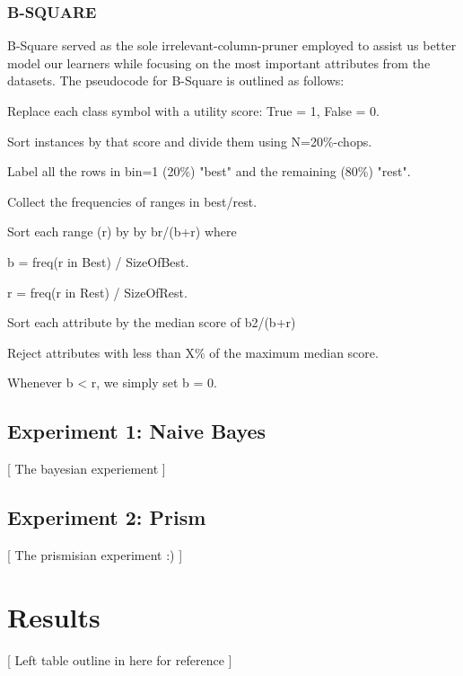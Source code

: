 \documentclass{sig-alternate}
\begin{document}
\subsubsection{B-SQUARE}
B-Square served as the sole irrelevant-column-pruner employed to assist us better model our learners while focusing on the most important attributes from the datasets. The pseudocode for B-Square is outlined as follows:

\begin{algorithmic}
\STATE Replace each class symbol with a utility score: True = 1, False = 0.

\STATE Sort instances by that score and divide them using N=20\%-chops.

\STATE Label all the rows in bin=1 (20\%) "best" and the remaining (80\%) "rest".

\STATE Collect the frequencies of ranges in best/rest.

\STATE Sort each range (r) by by  b^^2/(b+r) where

       \: \STATE b = freq(r in Best) / SizeOfBest.

       \: \STATE r = freq(r in Rest) / SizeOfRest.

\STATE Sort each attribute by the median score of b2/(b+r)

\STATE Reject attributes with less than X\% of the maximum median score.
\end{algorithmic}


Whenever b < r, we simply set b = 0.

\subsection{Experiment 1: Naive Bayes} 
[ The bayesian experiement ]


\subsection{Experiment 2: Prism}
[ The prismisian experiment :) ]

 
\section{Results} 
[ Left table outline in here for reference ]
 
\end{document}
